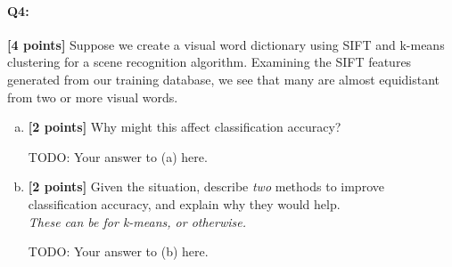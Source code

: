 





\pagebreak
\paragraph{Q4:} \textbf{[4 points]} Suppose we create a visual word dictionary using SIFT and k-means clustering for a scene recognition algorithm. Examining the SIFT features generated from our training database, we see that many are almost equidistant from two or more visual words. 
\begin{enumerate}[(a)]
    \item \textbf{[2 points]}
    Why might this affect classification accuracy?
    
    \begin{mdframed}
    TODO: Your answer to (a) here.
    \end{mdframed}

    \item \textbf{[2 points]}
    Given the situation, describe \emph{two} methods to improve classification accuracy, and explain why they would help.\\ 
    \emph{These can be for k-means, or otherwise.}
    
    \begin{mdframed}
    TODO: Your answer to (b) here.
    \end{mdframed}

\end{enumerate}



